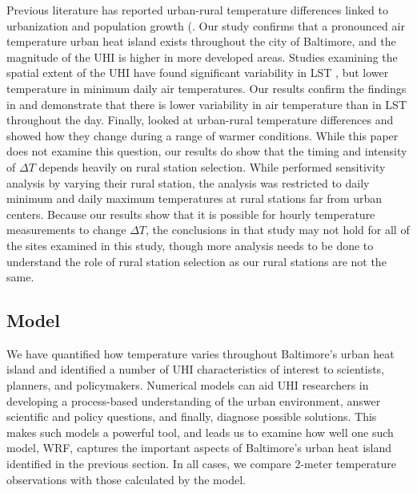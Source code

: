 \documentclass[draft,linenumbers]{agujournal}
\begin{document}
Previous literature has reported urban-rural temperature differences linked to urbanization and population growth (\cite{Huang20111753,Boug10}. Our study confirms that a pronounced air temperature urban heat island exists throughout the city of Baltimore, and the magnitude of the UHI is higher in more developed areas. Studies examining the spatial extent of the UHI have found significant variability in LST \citep{Huang20111753}, but lower temperature in minimum daily air temperatures. 
Our results confirm the findings in \cite{scott2017intraurban} and demonstrate that there is lower variability in air temperature than in LST throughout the day. Finally, \cite{scott2018reduced} looked at urban-rural temperature differences and showed how they change during a range of warmer conditions. While this paper does not examine this question, our results do show that the timing and intensity of $\Delta T$ depends heavily on rural station selection. While \cite{scott2018reduced} performed sensitivity analysis by varying their rural station, the analysis was restricted to daily minimum and daily maximum temperatures at rural stations far from urban centers. Because our results show that it is possible for hourly temperature measurements to change  
$\Delta T$, the conclusions in that study may not hold for all of the sites examined in this study, though more analysis needs to be done to understand the role of rural station selection as our rural stations are not the same.

\subsection{Model}
We have quantified how temperature varies throughout Baltimore's urban heat island and identified a number of UHI characteristics of interest to scientists, planners, and policymakers.
Numerical models can aid UHI researchers in developing a process-based understanding of the urban environment, answer scientific and policy questions, and finally, diagnose possible solutions. This makes such models a powerful tool, and leads us to examine how well one such model, WRF, captures the important aspects of Baltimore's urban heat island identified in the previous section. 
In all cases, we compare 2-meter temperature observations with those calculated by the model. 
\end{document}
